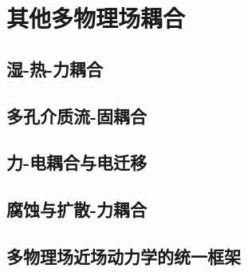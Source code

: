 \chapter{其他多物理场耦合}

\section{湿-热-力耦合}

\section{多孔介质流-固耦合}

\section{力-电耦合与电迁移}

\section{腐蚀与扩散-力耦合}

\section{多物理场近场动力学的统一框架}
